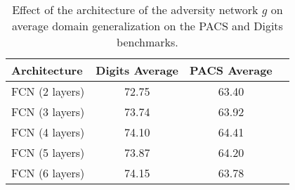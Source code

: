 \begin{table}[t]
    \centering
    \begin{tabular}{@{}lccc@{}}
        \toprule
        \textbf{Architecture} & \textbf{Digits Average} & \textbf{PACS Average} \\
        \midrule
        FCN (2 layers) & 72.75 & 63.40 \\
        FCN (3 layers) & 73.74 & 63.92\\
        FCN (4 layers) & 74.10 & 64.41 \\
        FCN (5 layers) & 73.87 & 64.20 \\
        FCN (6 layers) & 74.15 & 63.78\\
        \bottomrule
    \end{tabular}
    \caption{Effect of the architecture of the adversity network $g$ on average domain generalization on the PACS and Digits benchmarks.}
    \label{tab:gvars}
\end{table}

